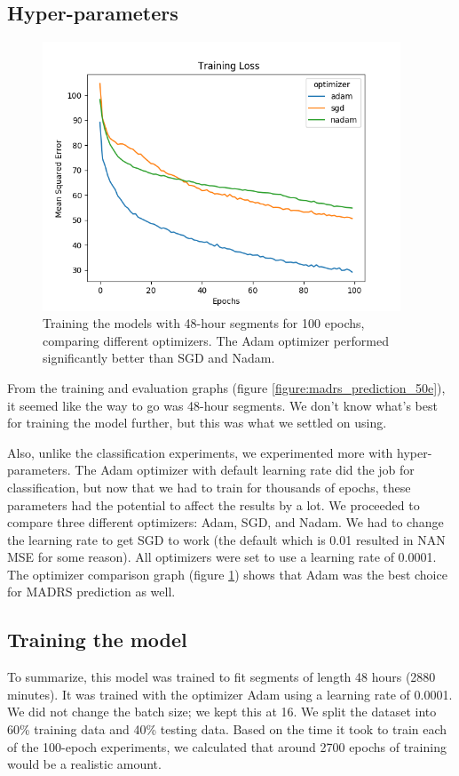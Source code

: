 \subsection{Hyper-parameters}
\begin{figure}
\begin{center}
      \includegraphics[height=8cm]{img/madrs_prediction/optimizers.png}
      \caption{Training the models with 48-hour segments for 100 epochs, comparing different optimizers. The Adam optimizer performed significantly better than SGD and Nadam.}
      \label{figure:madrs_prediction_optimizers}
\end{center}
\end{figure}

\noindent From the training and evaluation graphs (figure \ref{figure:madrs_prediction_50e}), it seemed like the way to go was 48-hour segments. We don't know what's best for training 
the model further, but this was what we settled on using. 

Also, unlike the classification experiments, we experimented more with hyper-parameters. The Adam optimizer with default learning rate did the job for classification, 
but now that we had to train for thousands of epochs, these parameters had the potential to affect the results by a lot. 
We proceeded to compare three different optimizers: Adam, SGD, and Nadam. We had to change the learning rate to get SGD to work 
(the default which is 0.01 \cite{keras_docs} resulted in NAN MSE for some reason). All optimizers were set to use a learning rate of 0.0001. 
The optimizer comparison graph (figure \ref{figure:madrs_prediction_optimizers}) shows that Adam was the best choice for MADRS prediction as well. 


\subsection{Training the model}
To summarize, this model was trained to fit segments of length 48 hours (2880 minutes). It was trained with the optimizer Adam using a learning rate of 0.0001. We did not change the batch size; we kept this at 16. We split the dataset into 60\% training data and 40\% testing data. Based on the time it took to train each of the 100-epoch experiments, we calculated that around 2700 epochs of training would be a realistic amount.

